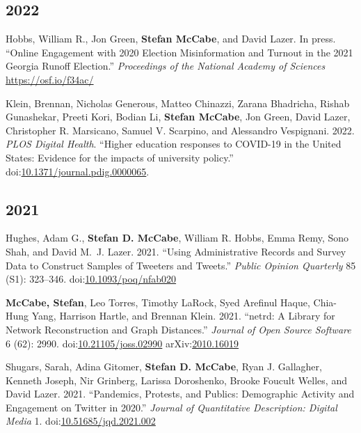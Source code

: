 \documentclass[11pt, letter]{article}
\begin{document}
\subsection{2022}
\begin{hangparas}{.25in}{1}
Hobbs, William R., Jon Green, \textbf{Stefan McCabe}, and David
Lazer. In press. ``Online Engagement with 2020 Election
Misinformation and Turnout in the 2021 Georgia Runoff Election.''
\textit{Proceedings of the National Academy of Sciences}
\href{https://osf.io/f34ac/}{https://osf.io/f34ac/}\vspace{2mm}

Klein, Brennan, Nicholas Generous, Matteo Chinazzi, Zarana Bhadricha,
Rishab Gunashekar, Preeti Kori, Bodian Li, \textbf{Stefan McCabe}, Jon
Green, David Lazer, Christopher R. Marsicano, Samuel V. Scarpino, and
Alessandro Vespignani. 2022. \textit{PLOS Digital Health}. ``Higher
education responses to COVID-19 in the United States: Evidence for the
impacts of university policy.''
doi:\href{https://doi.org/10.1371/journal.pdig.0000065}{10.1371/journal.pdig.0000065}.\vspace{2mm}
\end{hangparas}


\subsection{2021}
\begin{hangparas}{.25in}{1}
Hughes, Adam G.,\textsuperscript{\textdagger} \textbf{Stefan D.
McCabe},\textsuperscript{\textdagger} William R. Hobbs, Emma Remy, Sono
Shah, and David M.~J. Lazer. 2021. ``Using Administrative Records and
Survey Data to Construct Samples of Tweeters and Tweets.'' \textit{Public
Opinion Quarterly} 85 (S1): 323--346.
doi:\href{https://doi.org/10.1093/poq/nfab020}{10.1093/poq/nfab020}
\vspace{-1mm}

\textbf{McCabe, Stefan}, Leo Torres, Timothy LaRock, Syed Arefinul Haque,
Chia-Hung Yang, Harrison Hartle, and Brennan Klein. 2021.
``netrd: A Library for Network Reconstruction and Graph Distances.''
\textit{Journal of Open Source Software} 6 (62): 2990.
doi:\href{https://doi.org/10.21105/joss.02990}{10.21105/joss.02990}
arXiv:\href{https://arxiv.org/abs/2010.16019}{2010.16019} \vspace{-1mm}

Shugars, Sarah, Adina Gitomer, \textbf{Stefan D. McCabe}, Ryan J. Gallagher,
Kenneth Joseph, Nir Grinberg, Larissa Doroshenko, Brooke Foucult Welles, and
David Lazer. 2021. ``Pandemics, Protests, and Publics: Demographic Activity and
Engagement on Twitter in 2020.'' \textit{Journal of Quantitative Description:
  Digital Media} 1.
doi:\href{https://doi.org/10.51685/jqd.2021.002}{10.51685/jqd.2021.002} \vspace{2mm}
\end{hangparas}
\end{document}
